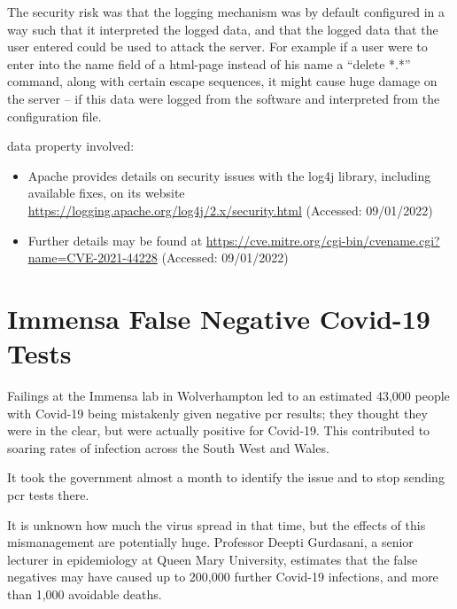 The security risk was that the logging mechanism was by default configured in a way such that it interpreted the logged data,
and that the logged data that the user entered could be used to attack the server.
For example if a user were to enter into the name field of a html-page instead of his name a ``delete *.*'' command, along with certain escape sequences,
it might cause huge damage on the server -- if this data were logged from the software and interpreted from the configuration file.

\Gls{data property} involved: 

\begin{itemize}
  \item Apache provides details on security issues with the log4j library, including available fixes, on its website \href{https://logging.apache.org/log4j/2.x/security.html}{https://logging.apache.org/log4j/2.x/security.html} (Accessed: 09/01/2022)
  \item Further details may be found at \href{https://cve.mitre.org/cgi-bin/cvename.cgi?name=CVE-2021-44228}{https://cve.mitre.org/cgi-bin/cvename.cgi?name=CVE-2021-44228} (Accessed: 09/01/2022)
\end{itemize}

\section{Immensa False Negative Covid-19  Tests} \label{bkm:incacc:immensa}
Failings at the Immensa lab in Wolverhampton led to an estimated 43,000 people with Covid-19 being mistakenly given negative \gls{pcr} results;
they thought they were in the clear, but were actually positive for Covid-19.
This contributed to soaring rates of infection across the South West and Wales.

It took the government almost a month to identify the issue and to stop sending \gls{pcr} tests there.

It is unknown how much the virus spread in that time, but the effects of this mismanagement are potentially huge.
Professor Deepti Gurdasani, a senior lecturer in epidemiology at Queen Mary University,
estimates that the false negatives may have caused up to 200,000 further Covid-19 infections, and more than 1,000 avoidable deaths.

